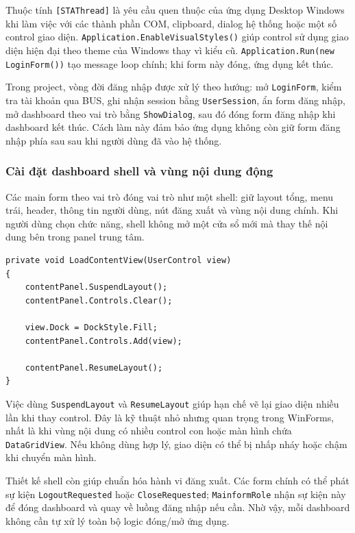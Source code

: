 \documentclass[12pt,a4paper]{article}
\numberwithin{figure}{subsection}
\numberwithin{table}{subsection}
\newcounter{codecounter}
\newenvironment{codeblock}[2]{%
    \refstepcounter{codecounter}%
    \phantomsection%
    \label{#1}%
    \par\smallskip
}{%
    \par\smallskip
}
\begin{document}
Thuộc tính \texttt{[STAThread]} là yêu cầu quen thuộc của ứng dụng Desktop Windows khi làm việc với các thành phần COM, clipboard, dialog hệ thống hoặc một số control giao diện. \texttt{Application.EnableVisualStyles()} giúp control sử dụng giao diện hiện đại theo theme của Windows thay vì kiểu cũ. \texttt{Application.Run(new LoginForm())} tạo message loop chính; khi form này đóng, ứng dụng kết thúc.

Trong project, vòng đời đăng nhập được xử lý theo hướng: mở \texttt{LoginForm}, kiểm tra tài khoản qua BUS, ghi nhận session bằng \texttt{UserSession}, ẩn form đăng nhập, mở dashboard theo vai trò bằng \texttt{ShowDialog}, sau đó đóng form đăng nhập khi dashboard kết thúc. Cách làm này đảm bảo ứng dụng không còn giữ form đăng nhập phía sau sau khi người dùng đã vào hệ thống.

\subsubsection{Cài đặt dashboard shell và vùng nội dung động}

Các main form theo vai trò đóng vai trò như một shell: giữ layout tổng, menu trái, header, thông tin người dùng, nút đăng xuất và vùng nội dung chính. Khi người dùng chọn chức năng, shell không mở một cửa sổ mới mà thay thế nội dung bên trong panel trung tâm.

\begin{codeblock}{code:dashboard-shell}{Nạp màn hình con trong dashboard}
\begin{verbatim}
private void LoadContentView(UserControl view)
{
    contentPanel.SuspendLayout();
    contentPanel.Controls.Clear();

    view.Dock = DockStyle.Fill;
    contentPanel.Controls.Add(view);

    contentPanel.ResumeLayout();
}
\end{verbatim}
\end{codeblock}

Việc dùng \texttt{SuspendLayout} và \texttt{ResumeLayout} giúp hạn chế vẽ lại giao diện nhiều lần khi thay control. Đây là kỹ thuật nhỏ nhưng quan trọng trong WinForms, nhất là khi vùng nội dung có nhiều control con hoặc màn hình chứa \texttt{DataGridView}. Nếu không dùng hợp lý, giao diện có thể bị nhấp nháy hoặc chậm khi chuyển màn hình.

Thiết kế shell còn giúp chuẩn hóa hành vi đăng xuất. Các form chính có thể phát sự kiện \texttt{LogoutRequested} hoặc \texttt{CloseRequested}; \texttt{MainformRole} nhận sự kiện này để đóng dashboard và quay về luồng đăng nhập nếu cần. Nhờ vậy, mỗi dashboard không cần tự xử lý toàn bộ logic đóng/mở ứng dụng.
\end{document}
